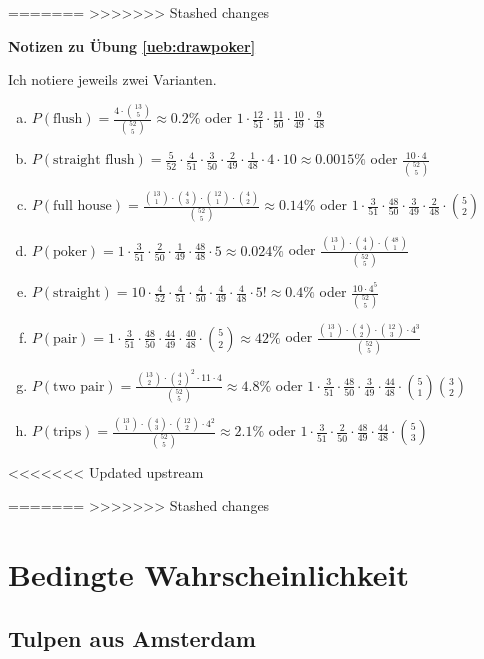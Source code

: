 \documentclass[%
<<<<<<< Updated upstream
11pt,%
twoside,%
titlepage,%
german,%
=======
11pt,%
twoside,%
titlepage,%
swissgerman,%
>>>>>>> Stashed changes
headsepline%
]{scrartcl}
\newcommand{\faReturnGray}{\textcolor{gray}{\faMailReply}} %
\theoremstyle{definition}
\theoremstyle{plain}
\newcommand{\concatueb}[1]{ueb:#1}%
\newcommand{\concatlsg}[1]{lsg:#1}%
\newenvironment{lsg}[1]{%
    \par\noindent\textbf{Notizen zu Übung \ref{\concatueb{#1}}}\label{\concatlsg{#1}}
    \hfill\hyperref[\concatueb{#1}]{\faReturnGray}\par %
}{%
    \par%
}
\newcommand{\concatueb}[1]{ueb:#1}%
\newcommand{\concatlsg}[1]{lsg:#1}%
\newenvironment{lsg}[1]{%
    \par\noindent\textbf{Notizen zu Übung \ref{\concatueb{#1}}.}%
    \label{\concatlsg{#1}}
}{%
    \par%
}
\begin{document}
=======
>>>>>>> Stashed changes
\begin{lsg}{drawpoker}
Ich notiere jeweils zwei Varianten.
\begin{enumerate}[a)]
\item $P(\text{flush})=\frac{4\cdot\binom{13}{5}}{\binom{52}{5}}\approx0.2\%$ oder $1\cdot\frac{12}{51}\cdot\frac{11}{50}\cdot\frac{10}{49}\cdot\frac{9}{48}$
\item $P(\text{straight flush})=\frac{5}{52}\cdot\frac{4}{51}\cdot\frac{3}{50}\cdot\frac{2}{49}\cdot\frac{1}{48}\cdot4\cdot10\approx0.0015\%$ oder $\frac{10\cdot4}{\binom{52}{5}}$
\item $P(\text{full house})=\frac{\binom{13}{1}\cdot\binom{4}{3}\cdot\binom{12}{1}\cdot\binom{4}{2}}{\binom{52}{5}}\approx0.14\%$ oder $1\cdot\frac{3}{51}\cdot\frac{48}{50}\cdot\frac{3}{49}\cdot\frac{2}{48}\cdot\binom{5}{2}$
\item $P(\text{poker})=1\cdot\frac{3}{51}\cdot\frac{2}{50}\cdot\frac{1}{49}\cdot\frac{48}{48}\cdot 5\approx0.024\%$ oder $\frac{\binom{13}{1}\cdot\binom{4}{4}\cdot\binom{48}{1}}{\binom{52}{5}}$
\item $P(\text{straight})=10\cdot\frac{4}{52}\cdot\frac{4}{51}\cdot\frac{4}{50}\cdot\frac{4}{49}\cdot\frac{4}{48}\cdot 5!\approx0.4\%$ oder $\frac{10\cdot4^5}{\binom{52}{5}}$
\item $P(\text{pair})=1\cdot\frac{3}{51}\cdot\frac{48}{50}\cdot\frac{44}{49}\cdot\frac{40}{48}\cdot\binom{5}{2}\approx42\%$ oder $\frac{\binom{13}{1}\cdot\binom{4}{2}\cdot\binom{12}{3}\cdot4^3}{\binom{52}{5}}$
\item $P(\text{two pair})=\frac{\binom{13}{2}\cdot\binom{4}{2}^{2}\cdot11\cdot 4}{\binom{52}{5}}\approx4.8\%$ oder $1\cdot\frac{3}{51}\cdot\frac{48}{50}\cdot\frac{3}{49}\cdot\frac{44}{48}\cdot\binom{5}{1}\binom{3}{2}$
\item $P(\text{trips})=\frac{\binom{13}{1}\cdot\binom{4}{3}\cdot\binom{12}{2}\cdot4^{2}}{\binom{52}{5}}\approx2.1\%$ oder $1\cdot\frac{3}{51}\cdot\frac{2}{50}\cdot\frac{48}{49}\cdot\frac{44}{48}\cdot\binom{5}{3}$
\end{enumerate}
\end{lsg}

\clearpage

<<<<<<< Updated upstream

=======
>>>>>>> Stashed changes
\section{Bedingte Wahrscheinlichkeit}
\subsection{Tulpen aus Amsterdam}
\end{document}
